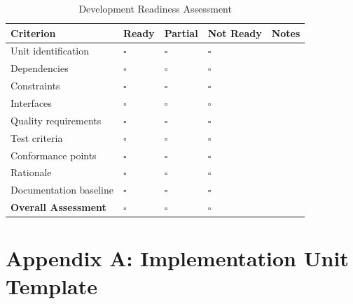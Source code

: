 \documentclass[11pt]{article}
\begin{document}
\begin{longtable}{@{}L{3cm} C{2cm} C{2cm} C{2cm} L{3.5cm}@{}}
\caption{Development Readiness Assessment} \\
\toprule
\textbf{Criterion} & \textbf{Ready} & \textbf{Partial} & \textbf{Not Ready} & \textbf{Notes} \\
\midrule
\endfirsthead
\bottomrule
\endlastfoot
Unit identification & $\square$ & $\square$ & $\square$ & \\
Dependencies & $\square$ & $\square$ & $\square$ & \\
Constraints & $\square$ & $\square$ & $\square$ & \\
Interfaces & $\square$ & $\square$ & $\square$ & \\
Quality requirements & $\square$ & $\square$ & $\square$ & \\
Test criteria & $\square$ & $\square$ & $\square$ & \\
Conformance points & $\square$ & $\square$ & $\square$ & \\
Rationale & $\square$ & $\square$ & $\square$ & \\
Documentation baseline & $\square$ & $\square$ & $\square$ & \\
\midrule
\textbf{Overall Assessment} & $\square$ & $\square$ & $\square$ & \\
\end{longtable}

\section{Appendix A: Implementation Unit Template}
\end{document}
